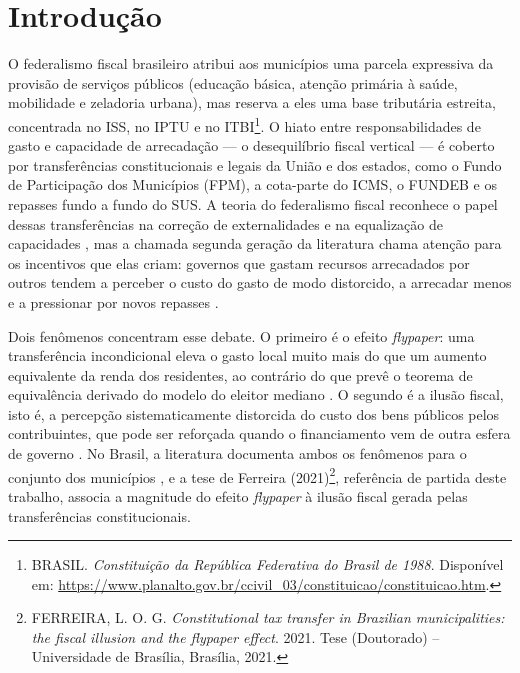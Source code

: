 \section{Introdução}\label{sec:intro}

O federalismo fiscal brasileiro atribui aos municípios uma parcela expressiva da provisão de serviços públicos (educação básica, atenção primária à saúde, mobilidade e zeladoria urbana), mas reserva a eles uma base tributária estreita, concentrada no ISS, no IPTU e no ITBI\footnote{BRASIL. \textit{Constituição da República Federativa do Brasil de 1988}. Disponível em: \url{https://www.planalto.gov.br/ccivil_03/constituicao/constituicao.htm}.}. O hiato entre responsabilidades de gasto e capacidade de arrecadação --- o desequilíbrio fiscal vertical --- é coberto por transferências constitucionais e legais da União e dos estados, como o Fundo de Participação dos Municípios (FPM), a cota-parte do ICMS, o FUNDEB e os repasses fundo a fundo do SUS. A teoria do federalismo fiscal reconhece o papel dessas transferências na correção de externalidades e na equalização de capacidades \cite{oates1999,bird2002}, mas a chamada segunda geração da literatura chama atenção para os incentivos que elas criam: governos que gastam recursos arrecadados por outros tendem a perceber o custo do gasto de modo distorcido, a arrecadar menos e a pressionar por novos repasses \cite{weingast2009,rodden2002,oates2008}.

Dois fenômenos concentram esse debate. O primeiro é o efeito \textit{flypaper}: uma transferência incondicional eleva o gasto local muito mais do que um aumento equivalente da renda dos residentes, ao contrário do que prevê o teorema de equivalência derivado do modelo do eleitor mediano \cite{bradford1971,hines1995}. O segundo é a ilusão fiscal, isto é, a percepção sistematicamente distorcida do custo dos bens públicos pelos contribuintes, que pode ser reforçada quando o financiamento vem de outra esfera de governo \cite{wagner1976,logan1986,dollery1996}. No Brasil, a literatura documenta ambos os fenômenos para o conjunto dos municípios \cite{cossio2001,mattos2011,ferreira2019,ferreira2022}, e a tese de Ferreira (2021)\footnote{FERREIRA, L. O. G. \textit{Constitutional tax transfer in Brazilian municipalities: the fiscal illusion and the flypaper effect}. 2021. Tese (Doutorado) -- Universidade de Brasília, Brasília, 2021.}, referência de partida deste trabalho, associa a magnitude do efeito \textit{flypaper} à ilusão fiscal gerada pelas transferências constitucionais.


